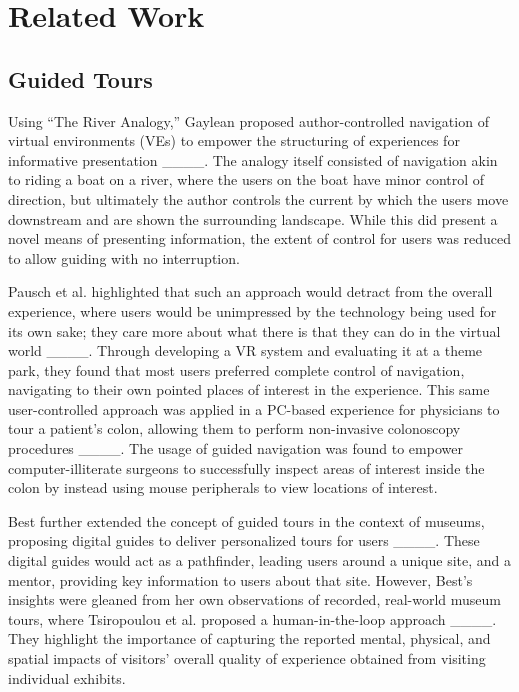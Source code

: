 \section{Related Work}
\subsection{Guided Tours}
Using ``The River Analogy,'' Gaylean proposed author-controlled navigation of virtual environments (VEs) to empower the structuring of experiences for informative presentation ____.
The analogy itself consisted of navigation akin to riding a boat on a river, where the users on the boat have minor control of direction, but ultimately the author controls the current by which the users move downstream and are shown the surrounding landscape.
While this did present a novel means of presenting information, the extent of control for users was reduced to allow guiding with no interruption.

Pausch et al. highlighted that such an approach would detract from the overall experience, where users would be unimpressed by the technology being used for its own sake; they care more about what there is that they can do in the virtual world ____.
Through developing a VR system and evaluating it at a theme park, they found that most users preferred complete control of navigation, navigating to their own pointed places of interest in the experience.
This same user-controlled approach was applied in a PC-based experience for physicians to tour a patient's colon, allowing them to perform non-invasive colonoscopy procedures ____.
The usage of guided navigation was found to empower computer-illiterate surgeons to successfully inspect areas of interest inside the colon by instead using mouse peripherals to view locations of interest.

Best further extended the concept of guided tours in the context of museums, proposing digital guides to deliver personalized tours for users ____.
These digital guides would act as a pathfinder, leading users around a unique site, and a mentor, providing key information to users about that site.
However, Best's insights were gleaned from her own observations of recorded, real-world museum tours, where Tsiropoulou et al. proposed a human-in-the-loop approach ____.
They highlight the importance of capturing the reported mental, physical, and spatial impacts of visitors' overall quality of experience obtained from visiting individual exhibits.\\

